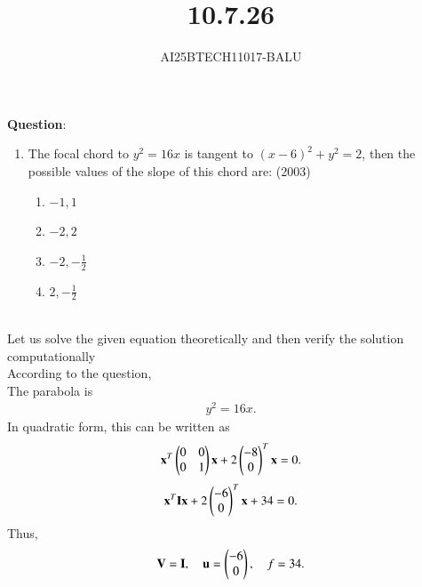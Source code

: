 \documentclass[journal]{IEEEtran}
\begin{document}

\vspace{3cm}
\title{10.7.26}
\author{AI25BTECH11017-BALU}
 \maketitle
{\let\newpage\relax\maketitle}
\renewcommand{\thefigure}{\theenumi}
\renewcommand{\thetable}{\theenumi}
\setlength{\intextsep}{10pt} %
\renewcommand{\thetable}{\theenumi}
\textbf{Question}:\\
\begin{enumerate}
    \item The focal chord to \( y^2 = 16x \) is tangent to \( (x - 6)^2 + y^2 = 2 \), then the possible values of the slope of this chord are: (2003)
    \begin{enumerate}
        \item \( -1, 1 \)
        \item \( -2, 2 \)
        \item \( -2, -\frac{1}{2} \)
        \item \( 2, -\frac{1}{2} \)
    \end{enumerate}
\end{enumerate}
\solution \\
Let us solve the given equation theoretically and then verify the solution computationally \\
According to the question, \\
The parabola is
\begin{align}
y^{2} = 16x.
\end{align}
In quadratic form, this can be written as
\begin{align}
\mathbf{x}^{T}
\begin{pmatrix}0 & 0 \\ 0 & 1\end{pmatrix}
\mathbf{x}
+
2\begin{pmatrix}-8 \\ 0\end{pmatrix}^{T}\mathbf{x} = 0.
\end{align}
\begin{align}
\mathbf{x}^{T}\mathbf{I}\mathbf{x} + 2
\begin{pmatrix}-6 \\ 0\end{pmatrix}^{T}\mathbf{x} + 34 = 0.
\end{align}
Thus,
\begin{align}
\mathbf{V} = \mathbf{I},\quad
\mathbf{u} = \begin{pmatrix}-6 \\ 0\end{pmatrix},\quad
f = 34.
\end{align}
\end{document}
